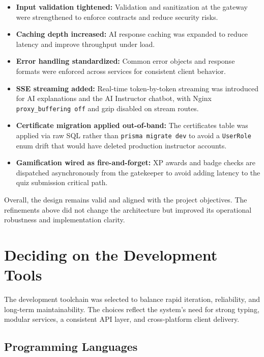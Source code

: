 \begin{itemize}
    \item \textbf{Input validation tightened:} Validation and sanitization at the gateway were strengthened to enforce contracts and reduce security risks.
    \item \textbf{Caching depth increased:} AI response caching was expanded to reduce latency and improve throughput under load.
    \item \textbf{Error handling standardized:} Common error objects and response formats were enforced across services for consistent client behavior.
    \item \textbf{SSE streaming added:} Real-time token-by-token streaming was introduced for AI explanations and the AI Instructor chatbot, with Nginx \texttt{proxy\_buffering off} and gzip disabled on stream routes.
    \item \textbf{Certificate migration applied out-of-band:} The certificates table was applied via raw SQL rather than \texttt{prisma migrate dev} to avoid a \texttt{UserRole} enum drift that would have deleted production instructor accounts.
    \item \textbf{Gamification wired as fire-and-forget:} XP awards and badge checks are dispatched asynchronously from the gatekeeper to avoid adding latency to the quiz submission critical path.
\end{itemize}

Overall, the design remains valid and aligned with the project objectives. The refinements above did not change the architecture but improved its operational robustness and implementation clarity.

\section{Deciding on the Development Tools}

The development toolchain was selected to balance rapid iteration, reliability, and long-term maintainability. The choices reflect the system's need for strong typing, modular services, a consistent API layer, and cross-platform client delivery.

\subsection{Programming Languages}

